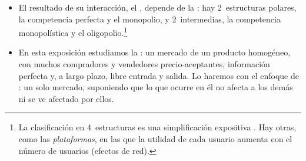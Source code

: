 \documentclass[11pt]{article}
\begin{document}
\begin{itemize}
\begin{itemize}
{\begin{itemize}
\item el enfoque de características de Kelvin \textcite{Lancaster1966New};
\item la producción doméstica de Gary \textcite{Becker1965Allocation} y de Reuben \textcite{Gronau1977Leisure};
\item la economía de la información de George J. \textcite{Stigler1961Information}, en la que conocer los precios y las calidades exige una búsqueda costosa que se combina con el bien físico.
\end{itemize}
La microeconomía estudia también otros agentes, como el sector público o las instituciones financieras.  recibió el Premio Nobel de Economía en 1982 «por sus estudios pioneros de las estructuras industriales, el funcionamiento de los mercados y las causas y los efectos de la regulación pública»\nocite{Nobel1982Stigler}, y , en 1992, «por haber extendido el análisis microeconómico a un amplio abanico de comportamientos e interacciones humanas, incluidos los que quedan fuera del mercado»\nocite{Nobel1992Becker}.} los consumidores eligen qué consumir sujetos a su restricción presupuestaria , y los productores transforman factores en productos con la tecnología disponible y al menor coste posible  .
  \item El resultado de su interacción, el , depende de la : hay 2~estructuras polares, la competencia perfecta y el monopolio, y 2~intermedias, la competencia monopolística y el oligopolio.\footnote{La clasificación en 4~estructuras es una simplificación expositiva   . Hay otras, como las \emph{plataformas}, en las que la utilidad de cada usuario aumenta con el número de usuarios (efectos de red).}
  \item En esta exposición estudiamos la : un mercado de un producto homogéneo, con muchos compradores y vendedores precio-aceptantes, información perfecta y, a largo plazo, libre entrada y salida. Lo haremos con el enfoque de : un solo mercado, suponiendo que lo que ocurre en él no afecta a los demás ni se ve afectado por ellos.
  \end{itemize}


\end{itemize}
\end{document}
